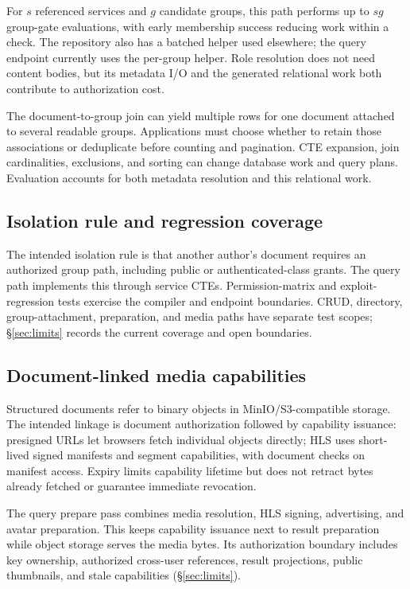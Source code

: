 \documentclass[sigconf, nonacm]{acmart}
\begin{document}
For $s$ referenced services and $g$ candidate groups, this path performs up to
$s g$ group-gate evaluations, with early membership success reducing work
within a check. The repository also has a batched helper used elsewhere; the
query endpoint currently uses the per-group helper. Role resolution does not
need content bodies, but its metadata I/O and the generated relational work
both contribute to authorization cost.

The document-to-group join can yield multiple rows for one document attached
to several readable groups. Applications must choose whether to retain those
associations or deduplicate before counting and pagination. CTE expansion,
join cardinalities, exclusions, and sorting can change database work and query
plans. Evaluation accounts for both metadata resolution and this relational
work.

\subsection{Isolation rule and regression coverage}

The intended isolation rule is that another author's document requires an
authorized group path, including public or authenticated-class grants.
The query path implements this through service CTEs.
Permission-matrix and exploit-regression tests exercise the compiler and
endpoint boundaries. CRUD, directory, group-attachment, preparation, and media
paths have separate test scopes; \S\ref{sec:limits} records the current coverage
and open boundaries.

\subsection{Document-linked media capabilities}

Structured documents refer to binary objects in MinIO/S3-compatible storage.
The intended linkage is document authorization followed by capability issuance:
presigned URLs let browsers fetch individual objects directly; HLS uses
short-lived signed manifests and segment capabilities, with document checks
on manifest access. Expiry limits capability lifetime but does not retract
bytes already fetched or guarantee immediate revocation.

The query prepare pass combines media resolution, HLS signing, advertising,
and avatar preparation. This keeps capability issuance next to result
preparation while object storage serves the media bytes. Its authorization
boundary includes key ownership, authorized cross-user references, result
projections, public thumbnails, and stale capabilities
(\S\ref{sec:limits}).
\end{document}
